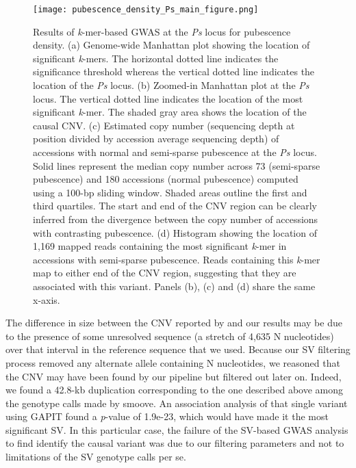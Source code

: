 \documentclass{article}
\begin{document}
\begin{figure}
	\centering
	\texttt{[image: pubescence\_density\_Ps\_main\_figure.png]}
	\caption[Results of \textit{k}-mer-based GWAS at the
	\textit{Ps} locus for pubescence density.]{Results of \textit{k}-mer-based GWAS at the
	\textit{Ps} locus for pubescence density.
	(a) Genome-wide Manhattan plot showing the location of significant \textit{k}-mers. The
	horizontal dotted line indicates the significance threshold whereas the
	vertical dotted line indicates the location of the \textit{Ps} locus.
	(b) Zoomed-in Manhattan plot at the \textit{Ps} locus. The
	vertical dotted line indicates the location of the most significant
	\textit{k}-mer. The shaded gray area shows the location of the causal CNV.
	(c) Estimated copy number (sequencing depth at position divided by
	accession average sequencing depth) of accessions with normal and
	semi-sparse pubescence at the \textit{Ps} locus. Solid lines represent
	the median copy number across 73 (semi-sparse pubescence) and 180
	accessions (normal pubescence) computed using a 100-bp sliding window.
	Shaded areas outline the first and third quartiles. The start and end
	of the CNV region can be clearly inferred from the divergence between
	the copy number of accessions with contrasting pubescence.
	(d) Histogram showing the location of 1,169 mapped reads containing the
	most significant \textit{k}-mer in accessions with semi-sparse pubescence.
	Reads containing this \textit{k}-mer map to either end of the CNV
	region, suggesting that they are associated with this variant. Panels
	(b), (c) and (d) share the same x-axis.}
	\label{pubescence-density-main-figure}
\end{figure}


The difference in size between the CNV reported by  and our
results may be due to the presence of some unresolved sequence (a stretch of
4,635 N nucleotides) over that interval in the reference sequence that we used.
Because our SV filtering process removed any alternate allele containing N nucleotides,
we reasoned that the CNV may have been found by our pipeline but
filtered out later on. Indeed, we found a 42.8-kb duplication corresponding
to the one described above among the genotype calls made by smoove. An association
analysis of that single variant using GAPIT found a \textit{p}-value of 1.9e-23,
which would have made it the most significant SV. In this particular case, the
failure of the SV-based GWAS analysis to find identify the causal variant was due
to our filtering parameters and not to limitations of the SV genotype calls per se.
\end{document}
